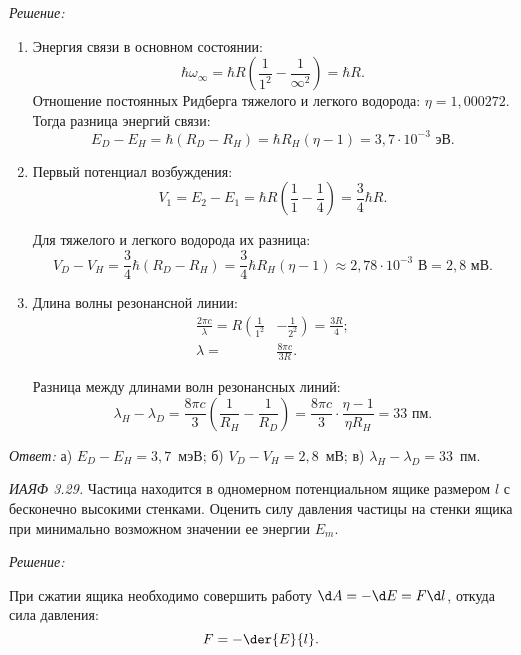 \vspace*{2em}
\emph{Решение:}
\begin{enumerate}
    \item Энергия связи в основном состоянии:
    \[
        \hbar\omega_\infty = \hbar R \left(\frac{1}{1^2} - \frac{1}{\infty^2}
        \right) = \hbar R.
    \]
    Отношение постоянных Ридберга тяжелого и легкого водорода:
    \( \eta = 1,\!000272 \). Тогда разница энергий связи:
    \[
        E_D - E_H = \hbar(R_D - R_H) = \hbar R_H (\eta - 1) = 3,7\cdot10^{-3}
        \text{ эВ}.
    \]
    
    \item Первый потенциал возбуждения:
    \[
        V_1 = E_2 - E_1 = \hbar R\left(\frac{1}{1} - \frac{1}{4}\right) =
        \frac{3}{4}\hbar R.
    \]
    
    Для тяжелого и легкого водорода их разница:
    \[
        V_D - V_H = \frac{3}{4}\hbar (R_D - R_H) = \frac{3}{4}\hbar R_H
        (\eta - 1) \approx 2,78\cdot10^{-3}\text{ В} = 2,8 \text{ мВ}.
    \]
    
    \item Длина волны резонансной линии:
    \begin{align*}
        \frac{2\pi c}{\lambda} = R\left(\frac{1}{1^2}\right. &
        - \left.\frac{1}{2^2}\right) = \frac{3R}{4}; \\
        \lambda = & \frac{8\pi c}{3R}.
    \end{align*}
    
    Разница между длинами волн резонансных линий:
    \[
        \lambda_H - \lambda_D = \frac{8\pi c}{3}\left(\frac{1}{R_H} -
        \frac{1}{R_D}\right) = \frac{8\pi c}{3}\cdot\frac{\eta - 1}{\eta R_H} =
        33 \text{ пм}.
    \]
\end{enumerate}

\vspace*{2em}
\emph{Ответ:} а) \( E_D - E_H = 3,\!7 \)~мэВ; б) \( V_D - V_H = 2,\!8 \)~мВ;
в) \( \lambda_H - \lambda_D = 33 \)~пм.
\newpage

\emph{ИАЯФ 3.29.}
Частица находится в одномерном потенциальном ящике размером \( l \) с
бесконечно высокими стенками. Оценить силу давления частицы на стенки ящика
при минимально возможном значении ее энергии \( E_m \).

\vspace*{2em}
\emph{Решение:}

При сжатии ящика необходимо совершить работу \( \d A = -\d E = F\d l \), откуда
сила давления:
\[
    F = -\der{E}{l}.
\]

